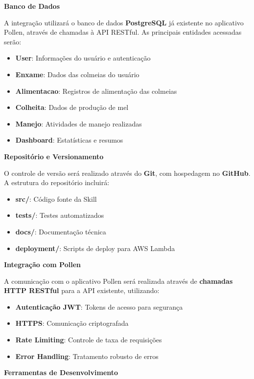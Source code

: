 \textbf{Banco de Dados}

A integração utilizará o banco de dados \textbf{PostgreSQL} já existente no aplicativo Pollen, através de chamadas à API RESTful. As principais entidades acessadas serão:

\begin{itemize}
    \item \textbf{User}: Informações do usuário e autenticação
    \item \textbf{Enxame}: Dados das colmeias do usuário
    \item \textbf{Alimentacao}: Registros de alimentação das colmeias
    \item \textbf{Colheita}: Dados de produção de mel
    \item \textbf{Manejo}: Atividades de manejo realizadas
    \item \textbf{Dashboard}: Estatísticas e resumos
\end{itemize}

\textbf{Repositório e Versionamento}

O controle de versão será realizado através do \textbf{Git}, com hospedagem no \textbf{GitHub}. A estrutura do repositório incluirá:

\begin{itemize}
    \item \textbf{src/}: Código fonte da Skill
    \item \textbf{tests/}: Testes automatizados
    \item \textbf{docs/}: Documentação técnica
    \item \textbf{deployment/}: Scripts de deploy para AWS Lambda
\end{itemize}

\textbf{Integração com Pollen}

A comunicação com o aplicativo Pollen será realizada através de \textbf{chamadas HTTP RESTful} para a API existente, utilizando:

\begin{itemize}
    \item \textbf{Autenticação JWT}: Tokens de acesso para segurança
    \item \textbf{HTTPS}: Comunicação criptografada
    \item \textbf{Rate Limiting}: Controle de taxa de requisições
    \item \textbf{Error Handling}: Tratamento robusto de erros
\end{itemize}

\textbf{Ferramentas de Desenvolvimento}

